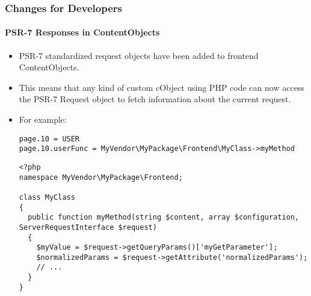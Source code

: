 %

\begin{frame}[fragile]
	\frametitle{Changes for Developers}
	\framesubtitle{PSR-7 Responses in ContentObjects}

	\lstset{basicstyle=\tiny\ttfamily}

	\begin{itemize}
		\item PSR-7 standardized request objects have been added to frontend ContentObjects.
		\item This means that any kind of custom cObject using PHP code can now
			access the PSR-7 Request object to fetch information about the current
			request.

		\item For example:

\begin{lstlisting}
page.10 = USER
page.10.userFunc = MyVendor\MyPackage\Frontend\MyClass->myMethod
\end{lstlisting}

\begin{lstlisting}
<?php
namespace MyVendor\MyPackage\Frontend;

class MyClass
{
  public function myMethod(string $content, array $configuration, ServerRequestInterface $request)
  {
    $myValue = $request->getQueryParams()['myGetParameter'];
    $normalizedParams = $request->getAttribute('normalizedParams');
	// ...
  }
}
\end{lstlisting}

	\end{itemize}
\end{frame}

